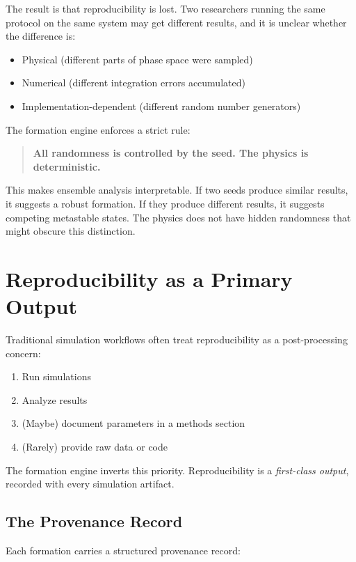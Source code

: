 \documentclass[11pt]{article}
\begin{document}
The result is that reproducibility is lost. Two researchers running the same protocol on the same system may get different results, and it is unclear whether the difference is:

\begin{itemize}
\item Physical (different parts of phase space were sampled)
\item Numerical (different integration errors accumulated)
\item Implementation-dependent (different random number generators)
\end{itemize}

The formation engine enforces a strict rule:

\begin{quote}
\textbf{All randomness is controlled by the seed. The physics is deterministic.}
\end{quote}

This makes ensemble analysis interpretable. If two seeds produce similar results, it suggests a robust formation. If they produce different results, it suggests competing metastable states. The physics does not have hidden randomness that might obscure this distinction.

\section{Reproducibility as a Primary Output}

Traditional simulation workflows often treat reproducibility as a post-processing concern:

\begin{enumerate}
\item Run simulations
\item Analyze results
\item (Maybe) document parameters in a methods section
\item (Rarely) provide raw data or code
\end{enumerate}

The formation engine inverts this priority. Reproducibility is a \textit{first-class output}, recorded with every simulation artifact.

\subsection{The Provenance Record}

Each formation carries a structured provenance record:
\end{document}

